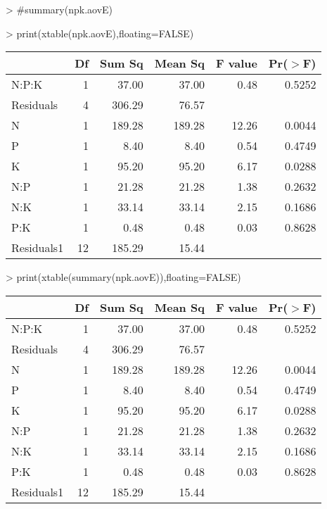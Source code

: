 \documentclass[letterpaper]{article}
\begin{document}
\begin{Schunk}
\begin{Sinput}
> #summary(npk.aovE)
\end{Sinput}
\end{Schunk}
\begin{Schunk}
\begin{Sinput}
> print(xtable(npk.aovE),floating=FALSE)
\end{Sinput}
% latex table generated in R 3.1.1 by xtable 1.7-3 package
% 
\begin{tabular}{lrrrrr}
  \hline
 & Df & Sum Sq & Mean Sq & F value & Pr($>$F) \\ 
  \hline
N:P:K     & 1 & 37.00 & 37.00 & 0.48 & 0.5252 \\ 
  Residuals & 4 & 306.29 & 76.57 &  &  \\ 
  N         & 1 & 189.28 & 189.28 & 12.26 & 0.0044 \\ 
  P         & 1 & 8.40 & 8.40 & 0.54 & 0.4749 \\ 
  K         & 1 & 95.20 & 95.20 & 6.17 & 0.0288 \\ 
  N:P       & 1 & 21.28 & 21.28 & 1.38 & 0.2632 \\ 
  N:K       & 1 & 33.14 & 33.14 & 2.15 & 0.1686 \\ 
  P:K       & 1 & 0.48 & 0.48 & 0.03 & 0.8628 \\ 
  Residuals1 & 12 & 185.29 & 15.44 &  &  \\ 
   \hline
\end{tabular}\end{Schunk}


\begin{Schunk}
\begin{Sinput}
> print(xtable(summary(npk.aovE)),floating=FALSE)
\end{Sinput}
% latex table generated in R 3.1.1 by xtable 1.7-3 package
% 
\begin{tabular}{lrrrrr}
  \hline
 & Df & Sum Sq & Mean Sq & F value & Pr($>$F) \\ 
  \hline
N:P:K     & 1 & 37.00 & 37.00 & 0.48 & 0.5252 \\ 
  Residuals & 4 & 306.29 & 76.57 &  &  \\ 
  N         & 1 & 189.28 & 189.28 & 12.26 & 0.0044 \\ 
  P         & 1 & 8.40 & 8.40 & 0.54 & 0.4749 \\ 
  K         & 1 & 95.20 & 95.20 & 6.17 & 0.0288 \\ 
  N:P       & 1 & 21.28 & 21.28 & 1.38 & 0.2632 \\ 
  N:K       & 1 & 33.14 & 33.14 & 2.15 & 0.1686 \\ 
  P:K       & 1 & 0.48 & 0.48 & 0.03 & 0.8628 \\ 
  Residuals1 & 12 & 185.29 & 15.44 &  &  \\ 
   \hline
\end{tabular}\end{Schunk}
\end{document}
